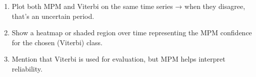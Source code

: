 \begin{enumerate}
    \item Plot both MPM and Viterbi on the same time series → when they disagree, that’s an uncertain period.
    \item Show a heatmap or shaded region over time representing the MPM confidence for the chosen (Viterbi) class.
    \item Mention that Viterbi is used for evaluation, but MPM helps interpret reliability.
\end{enumerate}








